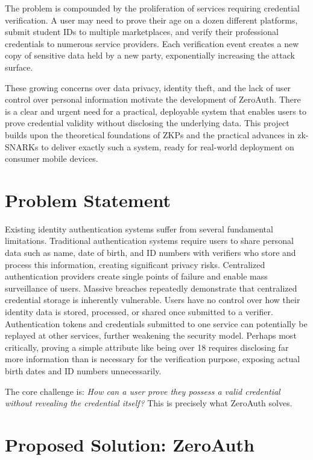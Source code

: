 The problem is compounded by the proliferation of services requiring credential verification. A user may need to prove their age on a dozen different platforms, submit student IDs to multiple marketplaces, and verify their professional credentials to numerous service providers. Each verification event creates a new copy of sensitive data held by a new party, exponentially increasing the attack surface.

These growing concerns over data privacy, identity theft, and the lack of user control over personal information motivate the development of ZeroAuth. There is a clear and urgent need for a practical, deployable system that enables users to prove credential validity without disclosing the underlying data. This project builds upon the theoretical foundations of ZKPs and the practical advances in zk-SNARKs to deliver exactly such a system, ready for real-world deployment on consumer mobile devices.

\section{Problem Statement}

Existing identity authentication systems suffer from several fundamental limitations. Traditional authentication systems require users to share personal data such as name, date of birth, and ID numbers with verifiers who store and process this information, creating significant privacy risks. Centralized authentication providers create single points of failure and enable mass surveillance of users. Massive breaches repeatedly demonstrate that centralized credential storage is inherently vulnerable. Users have no control over how their identity data is stored, processed, or shared once submitted to a verifier. Authentication tokens and credentials submitted to one service can potentially be replayed at other services, further weakening the security model. Perhaps most critically, proving a simple attribute like being over 18 requires disclosing far more information than is necessary for the verification purpose, exposing actual birth dates and ID numbers unnecessarily.

The core challenge is: \textit{How can a user prove they possess a valid credential without revealing the credential itself?} This is precisely what ZeroAuth solves.

\section{Proposed Solution: ZeroAuth}


